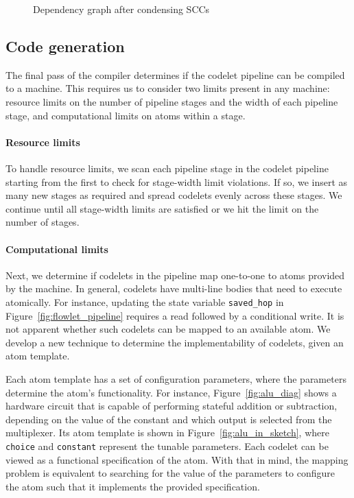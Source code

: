 \begin{figure}[!t]
\begin{minipage}{0.5\textwidth}
\caption{Dependency graph after condensing SCCs}
\label{fig:partitioning_after}
\end{minipage}
\end{figure}

\subsection{Code generation}
\label{ss:code_gen}
The final pass of the compiler determines if the codelet pipeline can be
compiled to a \absmachine machine.  This requires us to consider two limits
present in any \absmachine machine: resource limits on the number of pipeline
stages and the width of each pipeline stage, and computational limits on atoms
within a stage.

\paragraph{Resource limits}
To handle resource limits, we scan each pipeline stage in the codelet pipeline
starting from the first to check for stage-width limit violations.  If so, we
insert as many new stages as required and spread codelets evenly across these
stages.  We continue until all stage-width limits are satisfied or we
hit the limit on the number of stages.

\paragraph{Computational limits}
Next, we determine if codelets in the pipeline map one-to-one to atoms provided
by the \absmachine machine. In general, codelets have multi-line bodies that
need to execute atomically. For instance, updating the state variable
\texttt{saved\_hop} in Figure~\ref{fig:flowlet_pipeline} requires a read
followed by a conditional write.  It is not apparent whether such codelets can
be mapped to an available atom. We develop a new technique to determine the
implementability of codelets, given an atom template.

Each atom template has a set of configuration parameters, where the parameters
determine the atom's functionality.  For instance, Figure~\ref{fig:alu_diag}
shows a hardware circuit that is capable of performing stateful addition or
subtraction, depending on the value of the constant and which output is
selected from the multiplexer.  Its atom template is shown in
Figure~\ref{fig:alu_in_sketch}, where {\tt choice} and {\tt constant} represent
the tunable parameters.  Each codelet can be viewed as a functional
specification of the atom.  With that in mind, the mapping problem is
equivalent to searching for the value of the parameters to configure the atom
such that it implements the provided specification.

